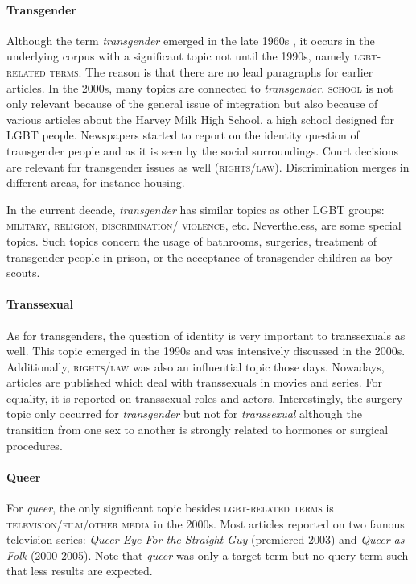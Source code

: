\documentclass[10pt,a4paper,twocolumn]{scrartcl}
\begin{document}
\paragraph*{Transgender} Although the term \textit{transgender} emerged in the late 1960s \citep{Oliven:1965}, it occurs in the underlying corpus with a significant topic not until the 1990s, namely \textsc{lgbt-related terms}. The reason is that there are no lead paragraphs for earlier articles. In the 2000s, many topics are connected to \textit{transgender}. \textsc{school} is not only relevant because of the general issue of integration but also because of various articles about the Harvey Milk High School, a high school designed for LGBT people. Newspapers started to report on the identity question of transgender people and as it is seen by the social surroundings. Court decisions are relevant for transgender issues as well (\textsc{rights/law}). Discrimination merges in different areas, for instance housing.

In the current decade, \textit{transgender} has similar topics as other LGBT groups: \textsc{military}, \textsc{religion}, \textsc{discrimination/ violence}, etc. Nevertheless, are some special topics. Such topics concern the usage of bathrooms, surgeries, treatment of transgender people in prison, or the acceptance of transgender children as boy scouts.

\paragraph*{Transsexual} As for transgenders, the question of identity is very important to transsexuals as well. This topic emerged in the 1990s and was intensively discussed in the 2000s. Additionally, \textsc{rights/law} was also an influential topic those days. Nowadays, articles are published which deal with transsexuals in movies and series. For equality, it is reported on transsexual roles and actors. Interestingly, the surgery topic only occurred for \textit{transgender} but not for \textit{transsexual} although the transition from one sex to another is strongly related  to hormones or surgical procedures.

\paragraph*{Queer} For \textit{queer}, the only significant topic besides \textsc{lgbt-related terms} is \textsc{television/film/other media} in the 2000s. Most articles reported on two famous television series: \textit{Queer Eye For the Straight Guy} (premiered 2003) and \textit{Queer as Folk} (2000-2005). Note that \textit{queer} was only a target term but no query term such that less results are expected.
\end{document}
